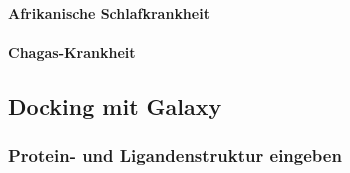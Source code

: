 \documentclass[11pt]{article}
\begin{document}
    \paragraph{Afrikanische Schlafkrankheit}

    \paragraph{Chagas-Krankheit}

    \subsection{Docking mit Galaxy}\label{subsec:galaxy}

%
%
%

    \subsubsection{Protein- und Ligandenstruktur eingeben}\label{subsec:protein--und-ligandenstruktur-eingeben}
\end{document}
